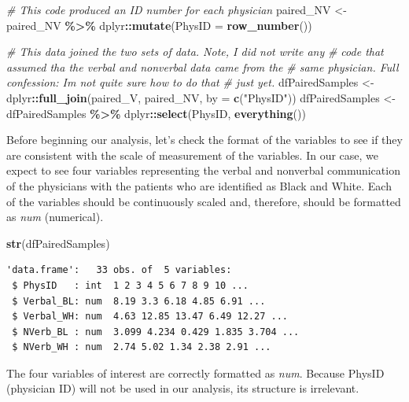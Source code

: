 \documentclass[
  11pt,
]{book}
\newenvironment{Shaded}{\begin{snugshade}}{\end{snugshade}}
\newcommand{\AttributeTok}[1]{\textcolor[rgb]{0.27,0.27,0.27}{#1}}
\newcommand{\CommentTok}[1]{\textcolor[rgb]{0.37,0.37,0.37}{\textit{#1}}}
\newcommand{\FunctionTok}[1]{\textcolor[rgb]{0.27,0.27,0.27}{\textbf{#1}}}
\newcommand{\NormalTok}[1]{#1}
\newcommand{\OtherTok}[1]{\textcolor[rgb]{0.37,0.37,0.37}{#1}}
\newcommand{\SpecialCharTok}[1]{\textcolor[rgb]{0.43,0.43,0.43}{\textbf{#1}}}
\newcommand{\StringTok}[1]{\textcolor[rgb]{0.5,0.5,0.5}{#1}}
\begin{document}
\begin{Shaded}
\begin{Highlighting}[]
\CommentTok{\# This code produced an ID number for each physician}
\NormalTok{paired\_NV }\OtherTok{\textless{}{-}}\NormalTok{ paired\_NV }\SpecialCharTok{\%\textgreater{}\%}
\NormalTok{    dplyr}\SpecialCharTok{::}\FunctionTok{mutate}\NormalTok{(}\AttributeTok{PhysID =} \FunctionTok{row\_number}\NormalTok{())}

\CommentTok{\# This data joined the two sets of data.  Note, I did not write any}
\CommentTok{\# code that assumed tha the verbal and nonverbal data came from the}
\CommentTok{\# same physician.  Full confession: I\textquotesingle{}m not quite sure how to do that}
\CommentTok{\# just yet.}
\NormalTok{dfPairedSamples }\OtherTok{\textless{}{-}}\NormalTok{ dplyr}\SpecialCharTok{::}\FunctionTok{full\_join}\NormalTok{(paired\_V, paired\_NV, }\AttributeTok{by =} \FunctionTok{c}\NormalTok{(}\StringTok{"PhysID"}\NormalTok{))}
\NormalTok{dfPairedSamples }\OtherTok{\textless{}{-}}\NormalTok{ dfPairedSamples }\SpecialCharTok{\%\textgreater{}\%}
\NormalTok{    dplyr}\SpecialCharTok{::}\FunctionTok{select}\NormalTok{(PhysID, }\FunctionTok{everything}\NormalTok{())}
\end{Highlighting}
\end{Shaded}

Before beginning our analysis, let's check the format of the variables to see if they are consistent with the scale of measurement of the variables. In our case, we expect to see four variables representing the verbal and nonverbal communication of the physicians with the patients who are identified as Black and White. Each of the variables should be continuously scaled and, therefore, should be formatted as \emph{num} (numerical).

\begin{Shaded}
\begin{Highlighting}[]
\FunctionTok{str}\NormalTok{(dfPairedSamples)}
\end{Highlighting}
\end{Shaded}

\begin{verbatim}
'data.frame':   33 obs. of  5 variables:
 $ PhysID   : int  1 2 3 4 5 6 7 8 9 10 ...
 $ Verbal_BL: num  8.19 3.3 6.18 4.85 6.91 ...
 $ Verbal_WH: num  4.63 12.85 13.47 6.49 12.27 ...
 $ NVerb_BL : num  3.099 4.234 0.429 1.835 3.704 ...
 $ NVerb_WH : num  2.74 5.02 1.34 2.38 2.91 ...
\end{verbatim}

The four variables of interest are correctly formatted as \emph{num}. Because PhysID (physician ID) will not be used in our analysis, its structure is irrelevant.
\end{document}
